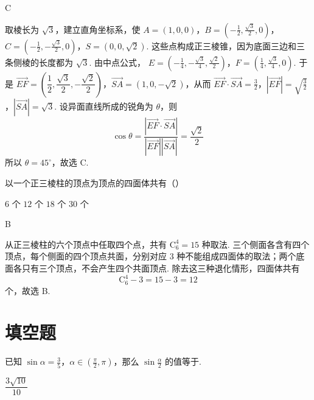 \documentclass[UTF8,a4paper,oneside,11pt]{ctexbook}
\begin{document}
\begin{answer}C\end{answer}

\begin{solution}
取棱长为 \(\sqrt3\)，建立直角坐标系，使
\(A=(1,0,0)\)，\(B=\left(-\frac12,\frac{\sqrt3}{2},0\right)\)，\(C=\left(-\frac12,-\frac{\sqrt3}{2},0\right)\)，\(S=(0,0,\sqrt2)\).
这些点构成正三棱锥，因为底面三边和三条侧棱的长度都为 \(\sqrt3\). 由中点公式，
\(E=\left(-\frac14,-\frac{\sqrt3}{4},\frac{\sqrt2}{2}\right)\)，\(F=\left(\frac14,\frac{\sqrt3}{4},0\right)\).
于是 \(\overrightarrow{EF}=\left(\dfrac12,\dfrac{\sqrt3}{2},-\dfrac{\sqrt2}{2}\right)\)，\(\overrightarrow{SA}=(1,0,-\sqrt2)\)，从而
\(\overrightarrow{EF}\cdot\overrightarrow{SA}=\frac32\)，\(\left|\overrightarrow{EF}\right|=\sqrt{\frac32}\)，\(\left|\overrightarrow{SA}\right|=\sqrt3\).
设异面直线所成的锐角为 \(\theta\)，则
\[
\cos\theta=\frac{\left|\overrightarrow{EF}\cdot\overrightarrow{SA}\right|}{\left|\overrightarrow{EF}\right|\left|\overrightarrow{SA}\right|}=\frac{\sqrt2}{2}
\]
所以 \(\theta=45^\circ\)，故选 C.
\end{solution}


\begin{problem}
以一个正三棱柱的顶点为顶点的四面体共有（\quad）

\choices
    {\(6\) 个}
    {\(12\) 个}
    {\(18\) 个}
    {\(30\) 个}
\end{problem}

\begin{answer}B\end{answer}

\begin{solution}
从正三棱柱的六个顶点中任取四个点，共有 \(\mathrm C_6^4=15\) 种取法. 三个侧面各含有四个顶点，每个侧面的四个顶点共面，分别对应 \(3\) 种不能组成四面体的取法；两个底面各只有三个顶点，不会产生四个共面顶点. 除去这三种退化情形，四面体共有
\[
\mathrm C_6^4-3=15-3=12
\]
个，故选 B.
\end{solution}

\section{填空题}

\begin{problem}
已知 \(\sin\alpha=\frac{3}{5}\)，\(\alpha\in\left( \frac{\pi}{2},\pi \right)\)，那么 \(\sin\frac{\alpha}{2}\) 的值等于\fillinblank{}.
\end{problem}

\begin{answer}\(\dfrac{3\sqrt{10}}{10}\)\end{answer}
\end{document}
